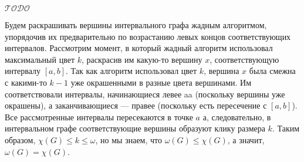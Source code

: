 \documentclass[a4paper,12pt]{article}
\numberwithin{figure}{section}
\def\TODO{\guillemotleft$\mathcal{TODO}$\guillemotright\textellipsis}
\begin{document}
\begin{solution}
	\TODO
	
	Будем раскрашивать вершины интервального графа жадным алгоритмом, упорядочив их предварительно по возрастанию левых концов соответствующих интервалов. Рассмотрим момент, в который жадный алгоритм использовал максимальный цвет $k$, раскрасив им какую-то вершину $x$, соответствующую интервалу $[a,b]$. Так как алгоритм использовал цвет $k$, вершина $x$ была смежна с какими-то $k-1$ уже окрашенными в разные цвета вершинами. Им соответствовали интервалы, начинающиеся левее aa (поскольку вершины уже окрашены), а заканчивающиеся — правее (поскольку есть пересечение с $[a,b]$). Все рассмотренные интервалы пересекаются в точке $a$ а, следовательно, в интервальном графе соответствующие вершины образуют клику размера $k$.
	Таким образом, $\chi(G) \leqslant k \leqslant \omega$, но мы знаем, что $\omega(G) \leqslant \chi(G)$, а значит, $\omega(G)=\chi(G)$.
\end{solution}
\end{document}
